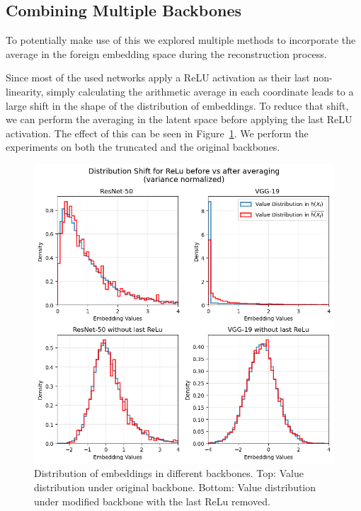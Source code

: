\documentclass[10pt,twocolumn]{article}
\begin{document}
\subsection{Combining Multiple Backbones}\label{combining_backbones}
To potentially make use of this we explored multiple methods to incorporate the average in the foreign embedding space during the reconstruction process.

Since most of the used networks apply a ReLU activation as their last non-linearity, simply calculating the arithmetic average in each coordinate leads to a large shift in the shape of the distribution of embeddings.
To reduce that shift, we can perform the averaging in the latent space before applying the last ReLU activation.
The effect of this can be seen in Figure~\ref{fig:relu_norelu_distribution_shift}.
We perform the experiments on both the truncated and the original backbones.

\begin{figure}[ht]
    \centering
    \includegraphics[width=\linewidth]{figures/relu-norelu-distribution-shift.png}
    \caption{
       Distribution of embeddings in different backbones.
       Top: Value distribution under original backbone.
       Bottom: Value distribution under modified backbone with the last ReLu removed.
    }
    \label{fig:relu_norelu_distribution_shift}
\end{figure}
\end{document}
